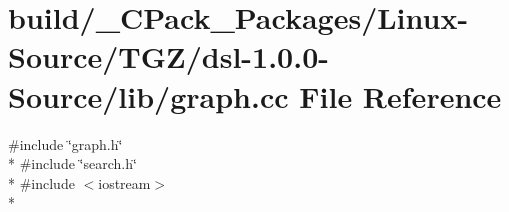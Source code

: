 \section{build/\-\_\-\-C\-Pack\-\_\-\-Packages/\-Linux-\/\-Source/\-T\-G\-Z/dsl-\/1.0.0-\/\-Source/lib/graph.cc File Reference}
\label{build_2__CPack__Packages_2Linux-Source_2TGZ_2dsl-1_80_80-Source_2lib_2graph_8cc}
{\ttfamily \#include \char`\"{}graph.\-h\char`\"{}}\\*
{\ttfamily \#include \char`\"{}search.\-h\char`\"{}}\\*
{\ttfamily \#include $<$iostream$>$}\\*
